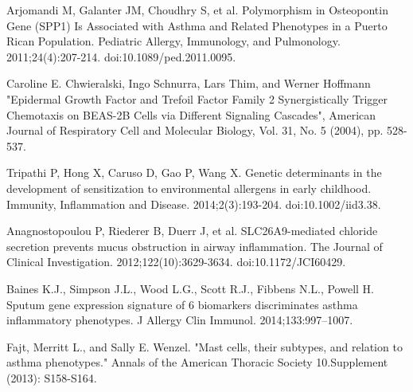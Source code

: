 \documentclass[conference,a4paper]{IEEEtran}
\begin{document}
\begin{thebibliography}{1}
	 Arjomandi M, Galanter JM, Choudhry S, et al. Polymorphism in Osteopontin Gene (SPP1) Is Associated with Asthma and Related Phenotypes in a Puerto Rican Population. Pediatric Allergy, Immunology, and Pulmonology. 2011;24(4):207-214. doi:10.1089/ped.2011.0095.
	
	 Caroline E. Chwieralski, Ingo Schnurra, Lars Thim, and Werner Hoffmann "Epidermal Growth Factor and Trefoil Factor Family 2 Synergistically Trigger Chemotaxis on BEAS-2B Cells via Different Signaling Cascades", American Journal of Respiratory Cell and Molecular Biology, Vol. 31, No. 5 (2004), pp. 528-537.
	
	 Tripathi P, Hong X, Caruso D, Gao P, Wang X. Genetic determinants in the development of sensitization to environmental allergens in early childhood. Immunity, Inflammation and Disease. 2014;2(3):193-204. doi:10.1002/iid3.38.
	
	 Anagnostopoulou P, Riederer B, Duerr J, et al. SLC26A9-mediated chloride secretion prevents mucus obstruction in airway inflammation. The Journal of Clinical Investigation. 2012;122(10):3629-3634. doi:10.1172/JCI60429.
	
	 Baines K.J., Simpson J.L., Wood L.G., Scott R.J., Fibbens N.L., Powell H. Sputum gene expression signature of 6 biomarkers discriminates asthma inflammatory phenotypes. J Allergy Clin Immunol. 2014;133:997–1007. 
	
	 Fajt, Merritt L., and Sally E. Wenzel. "Mast cells, their subtypes, and relation to asthma phenotypes." Annals of the American Thoracic Society 10.Supplement (2013): S158-S164.
	
	
\end{thebibliography}
\end{document}
